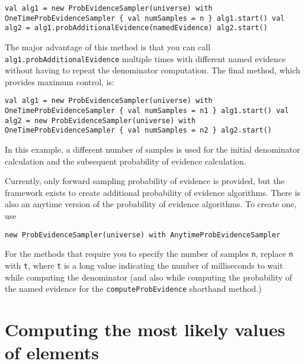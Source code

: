 \begin{flushleft}
\texttt{val alg1 = new ProbEvidenceSampler(universe) with
\newline \tab OneTimeProbEvidenceSampler \{ val numSamples = n \}
\newline alg1.start()
\newline val alg2 = alg1.probAdditionalEvidence(namedEvidence)
\newline alg2.start()
}
\end{flushleft}

The major advantage of this method is that you can call \texttt{alg1.prob\-AdditionalEvidence} multiple times with different named evidence without having to repeat the denominator computation. The final method, which provides maximum control, is:

\begin{flushleft}
\texttt{val alg1 = new ProbEvidenceSampler(universe) with
\newline \tab OneTimeProbEvidenceSampler \{ val numSamples = n1 \}
\newline alg1.start()
\newline val alg2 = new ProbEvidenceSampler(universe) with
\newline \tab OneTimeProbEvidenceSampler \{ val numSamples = n2 \}
\newline alg2.start()
}
\end{flushleft}

In this example, a different number of samples is used for the initial denominator calculation and the subsequent probability of evidence calculation.

Currently, only forward sampling probability of evidence is provided, but the framework exists to create additional probability of evidence algorithms. There is also an anytime version of the probability of evidence algorithms. To create one, use

\begin{flushleft}
\texttt{new ProbEvidenceSampler(universe) with AnytimeProbEvidenceSampler}
\end{flushleft}

For the methods that require you to specify the number of samples \texttt{n}, replace \texttt{n} with \texttt{t}, where \texttt{t} is a long value indicating the number of milliseconds to wait while computing the denominator (and also while computing the probability of the named evidence for the \texttt{computeProbEvidence} shorthand method.)

\section{Computing the most likely values of elements}

